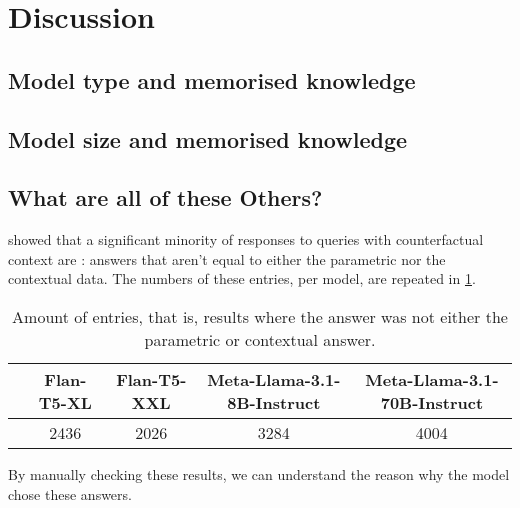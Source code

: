 \section{Discussion}
\label{discussion}

\subsection{Model type and memorised knowledge}
\label{model_type_parametric}

\subsection{Model size and memorised knowledge}
\label{model_size_parametric}

\subsection{What are all of these Others?}

 showed that a significant minority of responses to queries with counterfactual context are \Other{}: answers that aren't equal to either the parametric nor the contextual data.
The numbers of these entries, per model, are repeated in \cref{others_list}.

\begin{table}[h]
	\centering
	\footnotesize
	\begin{tabular}{>{\bfseries}l | c c c c}
		\toprule
			& \ttfamily Flan-T5-XL & \ttfamily Flan-T5-XXL & \ttfamily Meta-Llama-3.1-8B-Instruct & \ttfamily Meta-Llama-3.1-70B-Instruct \\
		\midrule
			\Other{} & 2436 & 2026 & 3284 & 4004 \\
		\bottomrule
	\end{tabular}
	\caption{Amount of \Other{} entries, that is, results where the answer was not either the parametric or contextual answer.}
	\label{others_list}
\end{table}

By manually checking these results, we can understand the reason why the model chose these answers.


